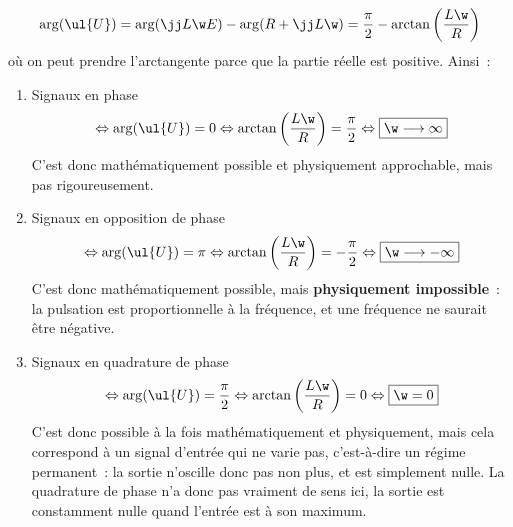 \documentclass[a4paper, 12pt, final, garamond]{book}
\begin{document}
\begin{enumerate}
	      \begin{gather*}
		      \arg(\ul{U})
		      = \arg(\jj L\w E) - \arg(R + \jj L \w)
		      = \frac{\pi}{2} - \arctan \left( \frac{L\w}{R} \right)
	      \end{gather*}
	      où on peut prendre l'arctangente parce que la partie réelle est
	      positive. Ainsi~:
	      \begin{enumerate}
		      \item Signaux en phase
		            \begin{gather*}
			            \Leftrightarrow
			            \arg(\ul{U}) = 0
			            \Leftrightarrow
			            \arctan \left( \frac{L\w}{R} \right) = \frac{\pi}{2}
			            \Leftrightarrow
			            \boxed{\w \longrightarrow \infty}
		            \end{gather*}
		            C'est donc mathématiquement possible et physiquement
		            approchable, mais pas rigoureusement.
		      \item Signaux en opposition de phase
		            \begin{gather*}
			            \Leftrightarrow
			            \arg(\ul{U}) = \pi
			            \Leftrightarrow
			            \arctan \left( \frac{L\w}{R} \right) = -\frac{\pi}{2}
			            \Leftrightarrow
			            \boxed{\w \longrightarrow -\infty}
		            \end{gather*}
		            C'est donc mathématiquement possible, mais \textbf{physiquement
			            impossible}~: la pulsation est proportionnelle à la fréquence,
		            et une fréquence ne saurait être négative.
		      \item Signaux en quadrature de phase
		            \begin{gather*}
			            \Leftrightarrow
			            \arg(\ul{U}) = \frac{\pi}{2}
			            \Leftrightarrow
			            \arctan \left( \frac{L\w}{R} \right) = 0
			            \Leftrightarrow
			            \boxed{\w = 0}
		            \end{gather*}
		            C'est donc possible à la fois mathématiquement et physiquement,
		            mais cela correspond à un signal d'entrée qui ne varie pas,
		            c'est-à-dire un régime permanent~: la sortie n'oscille donc pas
		            non plus, et est simplement nulle. La quadrature de phase n'a
		            donc pas vraiment de sens ici, la sortie est constamment nulle
		            quand l'entrée est à son maximum.
	      \end{enumerate}
\end{enumerate}
\end{document}
